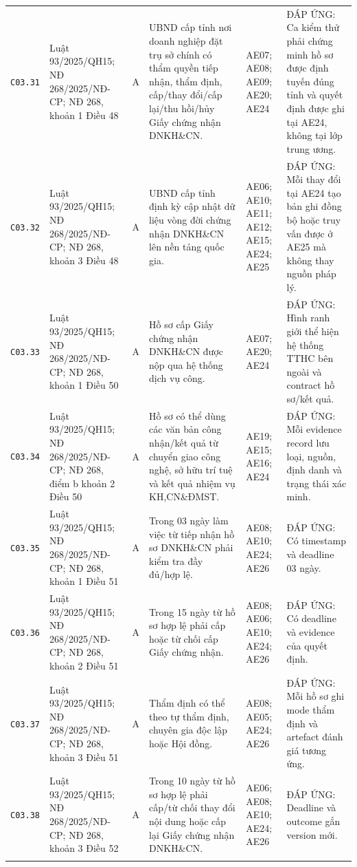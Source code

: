 \begin{longtable}{@{}p{0.9cm}p{3.0cm}p{0.55cm}p{4.05cm}p{2.0cm}p{3.45cm}@{}}
\texttt{C03.31} & Luật 93/2025/QH15; NĐ 268/2025/NĐ-CP; NĐ 268, khoản 1 Điều 48 & A & UBND cấp tỉnh nơi doanh nghiệp đặt trụ sở chính có thẩm quyền tiếp nhận, thẩm định, cấp/thay đổi/cấp lại/thu hồi/hủy Giấy chứng nhận DNKH\&CN. & AE07; AE08; AE09; AE20; AE24 & ĐÁP ỨNG: Ca kiểm thử phải chứng minh hồ sơ được định tuyến đúng tỉnh và quyết định được ghi tại AE24, không tại lớp trung ương. \\ \addlinespace[1pt]
\texttt{C03.32} & Luật 93/2025/QH15; NĐ 268/2025/NĐ-CP; NĐ 268, khoản 3 Điều 48 & A & UBND cấp tỉnh định kỳ cập nhật dữ liệu vòng đời chứng nhận DNKH\&CN lên nền tảng quốc gia. & AE06; AE10; AE11; AE12; AE15; AE24; AE25 & ĐÁP ỨNG: Mỗi thay đổi tại AE24 tạo bản ghi đồng bộ hoặc truy vấn được ở AE25 mà không thay nguồn pháp lý. \\ \addlinespace[1pt]
\texttt{C03.33} & Luật 93/2025/QH15; NĐ 268/2025/NĐ-CP; NĐ 268, khoản 1 Điều 50 & A & Hồ sơ cấp Giấy chứng nhận DNKH\&CN được nộp qua hệ thống dịch vụ công. & AE07; AE20; AE24 & ĐÁP ỨNG: Hình ranh giới thể hiện hệ thống TTHC bên ngoài và contract hồ sơ/kết quả. \\ \addlinespace[1pt]
\texttt{C03.34} & Luật 93/2025/QH15; NĐ 268/2025/NĐ-CP; NĐ 268, điểm b khoản 2 Điều 50 & A & Hồ sơ có thể dùng các văn bản công nhận/kết quả từ chuyển giao công nghệ, sở hữu trí tuệ và kết quả nhiệm vụ KH,CN\&ĐMST. & AE19; AE15; AE16; AE24 & ĐÁP ỨNG: Mỗi evidence record lưu loại, nguồn, định danh và trạng thái xác minh. \\ \addlinespace[1pt]
\texttt{C03.35} & Luật 93/2025/QH15; NĐ 268/2025/NĐ-CP; NĐ 268, khoản 1 Điều 51 & A & Trong 03 ngày làm việc từ tiếp nhận hồ sơ DNKH\&CN phải kiểm tra đầy đủ/hợp lệ. & AE08; AE10; AE24; AE26 & ĐÁP ỨNG: Có timestamp và deadline 03 ngày. \\ \addlinespace[1pt]
\texttt{C03.36} & Luật 93/2025/QH15; NĐ 268/2025/NĐ-CP; NĐ 268, khoản 2 Điều 51 & A & Trong 15 ngày từ hồ sơ hợp lệ phải cấp hoặc từ chối cấp Giấy chứng nhận. & AE08; AE06; AE10; AE24; AE26 & ĐÁP ỨNG: Có deadline và evidence của quyết định. \\ \addlinespace[1pt]
\texttt{C03.37} & Luật 93/2025/QH15; NĐ 268/2025/NĐ-CP; NĐ 268, khoản 3 Điều 51 & A & Thẩm định có thể theo tự thẩm định, chuyên gia độc lập hoặc Hội đồng. & AE08; AE05; AE24; AE26 & ĐÁP ỨNG: Mỗi hồ sơ ghi mode thẩm định và artefact đánh giá tương ứng. \\ \addlinespace[1pt]
\texttt{C03.38} & Luật 93/2025/QH15; NĐ 268/2025/NĐ-CP; NĐ 268, khoản 3 Điều 52 & A & Trong 10 ngày từ hồ sơ hợp lệ phải cấp/từ chối thay đổi nội dung hoặc cấp lại Giấy chứng nhận DNKH\&CN. & AE06; AE08; AE10; AE24; AE26 & ĐÁP ỨNG: Deadline và outcome gắn version mới. \\ \addlinespace[1pt]

\end{longtable}
